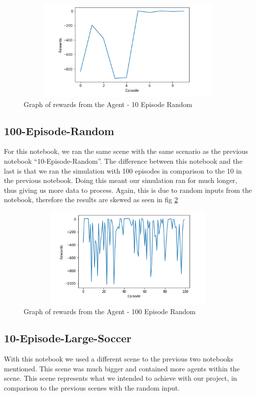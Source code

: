\begin{itemize}
\begin{figure}[H]
    \centering
    \includegraphics[width=120mm, height=50mm]{img/random10results.PNG}
    \caption{Graph of rewards from the Agent - 10 Episode Random}
    \label{fig:10EpResults}
\end{figure}

\subsection{100-Episode-Random}
For this notebook, we ran the same scene with the same scenario as the previous notebook “10-Episode-Random”. The difference between this notebook and the last is that we ran the simulation with 100 episodes in comparison to the 10 in the previous notebook. Doing this meant our simulation ran for much longer, thus giving us more data to process. Again, this is due to random inputs from the notebook, therefore the results are skewed as seen in fig \ref{fig:100EpResults}

\begin{figure}[H]
    \centering
    \includegraphics[width=120mm, height=50mm]{img/Large100Episode.PNG}
    \caption{Graph of rewards from the Agent - 100 Episode Random}
    \label{fig:100EpResults}
\end{figure}

\subsection{10-Episode-Large-Soccer}
With this notebook we used a different scene to the previous two notebooks mentioned. This scene was much bigger and contained more agents within the scene. This scene represents what we intended to achieve with our project, in comparison to the previous scenes with the random input. 


\end{itemize}
